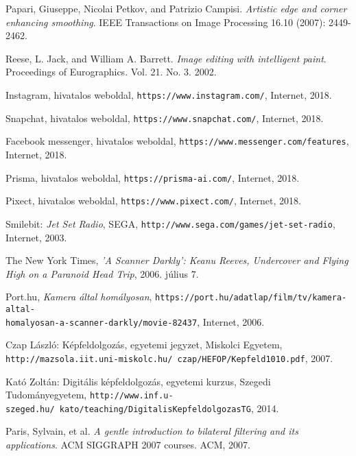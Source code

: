 
\begin{thebibliography}{x}


Papari, Giuseppe, Nicolai Petkov, and Patrizio Campisi. \emph{Artistic edge and corner enhancing smoothing}. IEEE Transactions on Image Processing 16.10 (2007): 2449-2462.

Reese, L. Jack, and William A. Barrett. \emph{Image editing with intelligent paint}. Proceedings of Eurographics. Vol. 21. No. 3. 2002.

Instagram, hivatalos weboldal, \texttt{https://www.instagram.com/}, Internet, 2018.

Snapchat, hivatalos weboldal, \texttt{https://www.snapchat.com/}, Internet, 2018.

Facebook messenger, hivatalos weboldal, \texttt{https://www.messenger.com/features}, Internet, 2018.

Prisma, hivatalos weboldal, \texttt{https://prisma-ai.com/}, Internet, 2018.

Pixect, hivatalos weboldal, \texttt{https://www.pixect.com/}, Internet, 2018.

Smilebit: \emph{Jet Set Radio}, SEGA, \texttt{http://www.sega.com/games/jet-set-radio}, Internet, 2003.

The New York Times, \emph{'A Scanner Darkly': Keanu Reeves, Undercover and Flying High on a Paranoid Head Trip}, 2006. július 7.

Port.hu, \emph{Kamera által homályosan}, \texttt{https://port.hu/adatlap/film/tv/kamera-altal-\\homalyosan-a-scanner-darkly/movie-82437}, Internet, 2006.

Czap László: Képfeldolgozás, egyetemi jegyzet, Miskolci Egyetem, \\ \texttt{http://mazsola.iit.uni-miskolc.hu/~czap/HEFOP/Kepfeld1010.pdf}, 2007.

Kató Zoltán: Digitális képfeldolgozás, egyetemi kurzus, Szegedi Tudományegyetem, \texttt{http://www.inf.u-szeged.hu/~kato/teaching/DigitalisKepfeldolgozasTG}, 2014.

Paris, Sylvain, et al. \emph{A gentle introduction to bilateral filtering and its applications}. ACM SIGGRAPH 2007 courses. ACM, 2007.


\end{thebibliography}
